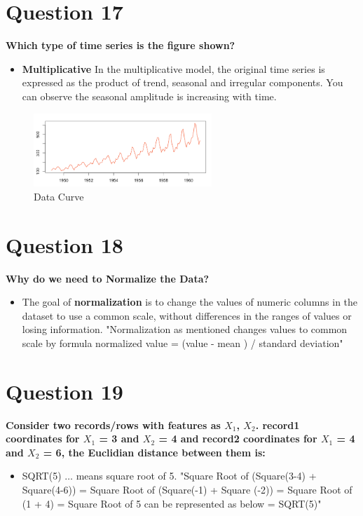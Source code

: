 \documentclass[10pt,letterpaper]{article}
\begin{document}
\section{Question 17}
\textbf{Which type of time series is the figure shown?}
\begin{itemize}
\item \textbf{Multiplicative} In the multiplicative model, the original time series is expressed as the product of trend, seasonal and irregular components. You can observe the seasonal amplitude is increasing with time.
\end{itemize}

\begin{figure}[H]
\includegraphics[width=0.6\textwidth]{multiplicative_time_data.png}
\centering
\caption{Data Curve}
\label{figure1}
\end{figure}


\section{Question 18}
\textbf{Why do we need to Normalize the Data?}
\begin{itemize}
\item The goal of \textbf{normalization}  is to change the values of numeric columns in the dataset to use a common scale, without differences in the ranges of values or losing information. "Normalization as mentioned changes values to common scale by formula normalized value = (value - mean ) / standard deviation"
\end{itemize}


\section{Question 19}
\textbf{Consider two records/rows with features as $X_{1}$, $X_{2}$.  record1 coordinates for $X_{1}$ = 3 and $X_{2}$ = 4 and record2 coordinates for $X_{1}$ = 4 and $X_{2}$ = 6, the Euclidian distance between them is:}
\begin{itemize}
\item SQRT(5) $\ldots$ means square root of 5. "Square Root of (Square(3-4) + Square(4-6)) = Square Root of (Square(-1) + Square (-2)) = Square Root of (1 + 4) = Square Root of 5 can be represented as below = SQRT(5)"
\end{itemize}
\end{document}
